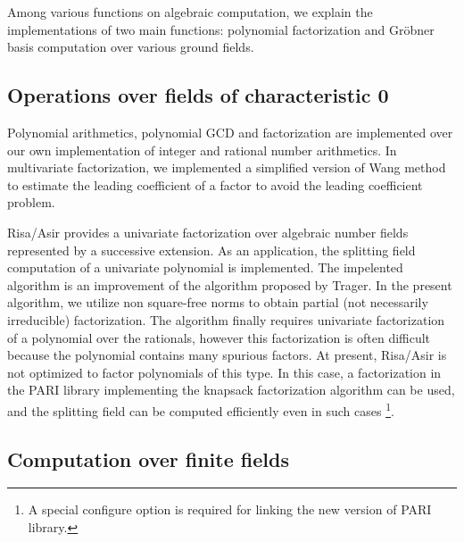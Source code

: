 \documentclass[12pt]{article}
\begin{document}
Among various functions on algebraic computation,
we explain the implementations of two main functions: polynomial
factorization and Gr\"obner basis computation over various ground
fields.

\subsection{Operations over fields of characteristic 0}

Polynomial arithmetics, polynomial GCD and factorization are
implemented over our own implementation of integer and rational number
arithmetics.  In multivariate factorization, we implemented a
simplified version of Wang method to estimate the leading coefficient
of a factor to avoid the leading coefficient problem.

Risa/Asir provides a univariate factorization over algebraic number
fields represented by a successive extension.  As an application, the
splitting field computation of a univariate polynomial is implemented.
The impelented algorithm is an improvement of the algorithm proposed
by Trager. In the present algorithm, we utilize non square-free norms
to obtain partial (not necessarily irreducible) factorization. The
algorithm finally requires univariate factorization of a polynomial
over the rationals, however this factorization is often difficult
because the polynomial contains many spurious factors.  At present,
Risa/Asir is not optimized to factor polynomials of this type.  In
this case, a factorization in the PARI library implementing the
knapsack factorization algorithm can be used, and the splitting field
can be computed efficiently even in such cases
\footnote{A special configure option is required for linking the new version
of PARI library.}.

\subsection{Computation over finite fields}
\end{document}
